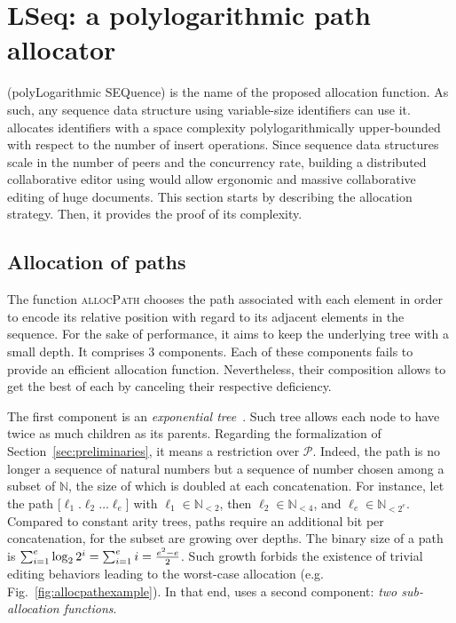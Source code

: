 

\section{LSeq: a polylogarithmic path allocator}
\label{sec:proposal}

\LSEQ (polyLogarithmic SEQuence) is the name of the proposed allocation
function. As such, any sequence data structure using variable-size identifiers
can use it. \LSEQ allocates identifiers with a space complexity
polylogarithmically upper-bounded with respect to the number of insert
operations. Since sequence data structures scale in the number of peers and the
concurrency rate, building a distributed collaborative editor using \LSEQ would
allow ergonomic and massive collaborative editing of huge documents. This
section starts by describing the allocation strategy. Then, it provides the
proof of its complexity.

\subsection{Allocation of paths}
\label{subsec:lseqallocation}

The function \textsc{allocPath} chooses the path associated with each element in
order to encode its relative position with regard to its adjacent elements in
the sequence. For the sake of performance, it aims to keep the underlying tree
with a small depth. It comprises 3 components. Each of these components fails to
provide an efficient allocation function. Nevertheless, their composition allows
to get the best of each by canceling their respective deficiency.

The first component is an \emph{exponential
  tree}~\cite{andersson1996faster,andersson2007dynamic}. Such tree allows each
node to have twice as much children as its parents. Regarding the formalization
of Section~\ref{sec:preliminaries}, it means a restriction over
$\mathcal{P}$. Indeed, the path is no longer a sequence of natural numbers but a
sequence of number chosen among a subset of $\mathbb{N}$, the size of which is
doubled at each concatenation. For instance, let the path
[$\ell_1.\ell_2\ldots\ell_e$] with $\ell_1\in\mathbb{N}_{<2}$, then
$\ell_2\in \mathbb{N}_{<4}$, and $\ell_{e}\in\mathbb{N}_{<2^e}$. Compared to
constant arity trees, paths require an additional bit per concatenation, for the
subset are growing over depths. The binary size of a path is
$\textstyle\sum\nolimits_{i=1}^{e}\log_2{2^i}=\sum\nolimits_{i=1}^{e}i=
{e^2-e\over{2}}$.
Such growth forbids the existence of trivial editing behaviors leading to the
worst-case allocation (e.g. Fig.~\ref{fig:allocpathexample}). In that end, \LSEQ
uses a second component: \emph{two sub-allocation functions}.

